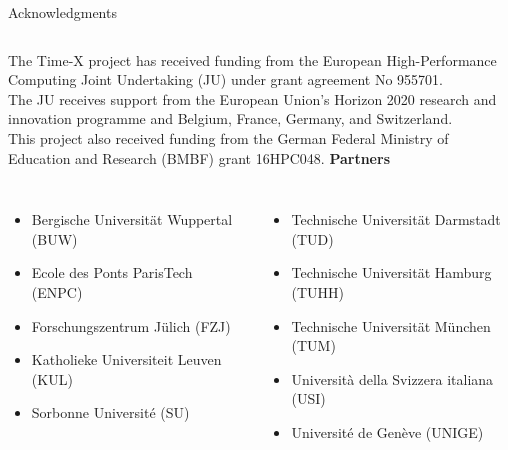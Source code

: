 \documentclass[11pt,aspectratio=43]{beamer}
\begin{document}
\begin{frame}{Acknowledgments}
\begin{columns}
	\end{columns}
	The Time-X project has received funding from the European High-Performance
	Computing Joint Undertaking (JU) under grant agreement No 955701.\\
	The JU receives support from the European Union’s Horizon 2020 research
	and innovation programme and Belgium, France, Germany, and Switzerland.\\
	This project also received funding from the German Federal Ministry of
	Education and Research (BMBF) grant 16HPC048.\vskip10pt	
	\textbf{Partners}
	\begin{columns}
		\begin{itemize}
			\item Bergische Universität Wuppertal (BUW)
			\item Ecole des Ponts ParisTech (ENPC)
			\item Forschungszentrum Jülich (FZJ)
			\item Katholieke Universiteit Leuven (KUL)
			\item Sorbonne Université (SU)
		\end{itemize}
		\begin{itemize}
			\item Technische Universität Darmstadt (TUD)
			\item Technische Universität Hamburg (TUHH)
			\item Technische Universität München (TUM)
			\item Università della Svizzera italiana (USI)
			\item Université de Genève (UNIGE)
		\end{itemize}
	\end{columns}
	\vspace*{-35pt}
\end{frame}

\appendix
\end{document}
